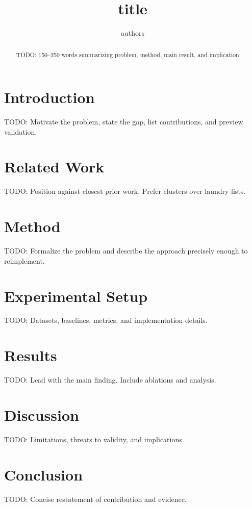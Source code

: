 \documentclass[11pt]{article}
\title{{{title}}}
\author{{{authors}}}
\begin{document}
\maketitle

\begin{abstract}
TODO: 150--250 words summarizing problem, method, main result, and implication.
\end{abstract}

\section{Introduction}
TODO: Motivate the problem, state the gap, list contributions, and preview validation.

\section{Related Work}
TODO: Position against closest prior work. Prefer clusters over laundry lists.

\section{Method}
TODO: Formalize the problem and describe the approach precisely enough to reimplement.

\section{Experimental Setup}
TODO: Datasets, baselines, metrics, and implementation details.

\section{Results}
TODO: Lead with the main finding. Include ablations and analysis.

\section{Discussion}
TODO: Limitations, threats to validity, and implications.

\section{Conclusion}
TODO: Concise restatement of contribution and evidence.



\end{document}
